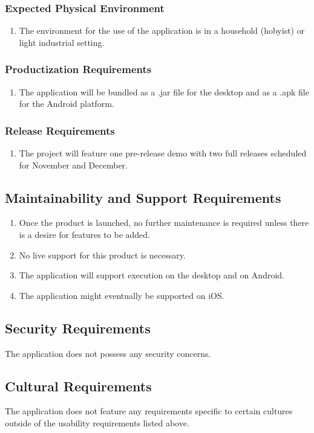 \documentclass{article}
\begin{document}
\subsubsection{Expected Physical Environment}
\begin{enumerate}
\item The environment for the use of the application is in a household (hobyist) or light industrial setting.
\end{enumerate}
\subsubsection{Productization Requirements}
\begin{enumerate}
\item The application will be bundled as a .jar file for the desktop and as a .apk file for the Android platform.
\end{enumerate}
\subsubsection{Release Requirements}
\begin{enumerate}
\item The project will feature one pre-release demo with two full releases scheduled for November and December.
\end{enumerate}
\subsection{Maintainability and Support Requirements}
\begin{enumerate}
\item Once the product is launched, no further maintenance is required unless there is a desire for features to be added.
\item No live support for this product is necessary.
\item The application will support execution on the desktop and on Android.
\item The application might eventually be supported on iOS.
\end{enumerate}
\subsection{Security Requirements}
The application does not possess any security concerns.
\subsection{Cultural Requirements}
The application does not feature any requirements specific to certain cultures outside of the usability requirements listed above.
\end{document}
